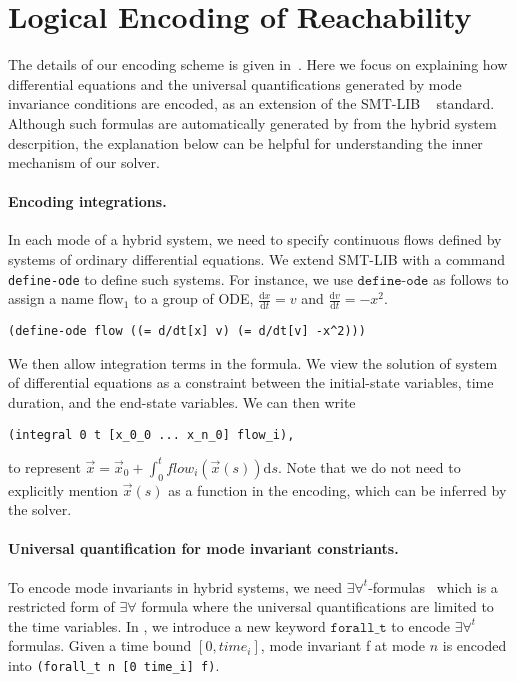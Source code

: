 \section{Logical Encoding of Reachability}


The details of our encoding scheme is given in~\cite{DBLP:journals/corr/GaoKCC14}.
Here we focus on explaining how differential equations and the universal quantifications
generated by mode invariance conditions are encoded, as an extension of the SMT-LIB
~\cite{BarST-SMT-10} standard. Although such formulas are automatically generated by \dReach{}
from the hybrid system descrpition, the explanation below can be helpful for
understanding the inner mechanism of our solver.

\paragraph{Encoding integrations.}
In each mode of a hybrid system, we need to specify continuous flows defined
by systems of ordinary differential equations. We extend SMT-LIB with a command
\texttt{define-ode} to define such systems. For instance, we use $\texttt{define-ode}$ as follows to
assign a name $\mathrm{flow_1}$ to a group of ODE,
$\frac{\mathrm{d}x}{\mathrm{d}t} = v$ and
$\frac{\mathrm{d}v}{\mathrm{d}t} = -x^2$.
\begin{Verbatim}[fontfamily=courier, fontsize=\small]
(define-ode flow ((= d/dt[x] v) (= d/dt[v] -x^2)))
\end{Verbatim}
We then allow integration terms in the formula. We view the solution of system of differential equations
as a constraint between the initial-state variables, time duration, and the end-state variables. We can then write
\begin{Verbatim}[fontfamily=courier, fontsize=\small]
(integral 0 t [x_0_0 ... x_n_0] flow_i),
\end{Verbatim}
to represent
$\vec x = \vec x_0 + \int_0^t flow_i(\vec x(s))\mathrm{d}s$. Note that we do not need to explicitly mention $\vec x(s)$ as a function in the encoding, which can be inferred by the solver.

\paragraph{Universal quantification for mode invariant constriants.} To encode mode invariants in hybrid systems, we
need $\exists\forall^t$-formulas~\cite{DBLP:conf/fmcad/GaoKC13} which
is a restricted form of $\exists\forall$ formula where the universal
quantifications are limited to the time variables. In \drh{}, we
introduce a new keyword $\texttt{forall\_t}$ to encode
$\exists\forall^t$ formulas. Given a time bound $[0, time_i]$, mode
invariant f at mode $n$ is encoded into \texttt{(forall\_t n [0
  time\_i] f)}.

